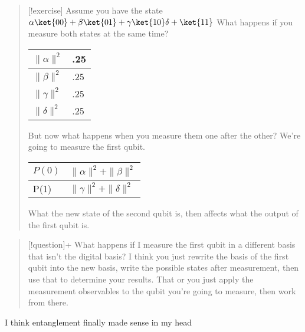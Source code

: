 \documentclass[]{article}
\begin{document}
\begin{quote}
{[}!exercise{]} Assume you have the state
\(\alpha \ket{00}+\beta \ket{01}+\gamma \ket{10}\delta+ \ket{11}\) What
happens if you measure both states at the same time?

\begin{longtable}[]{@{}ll@{}}
\toprule\noalign{}
\(\|\alpha\|^{2}\) & .25 \\
\midrule\noalign{}
\endhead
\bottomrule\noalign{}
\endlastfoot
\(\|\beta\|^{2}\) & .25 \\
\(\|\gamma\|^{2}\) & .25 \\
\(\|\delta\|^{2}\) & .25 \\
\end{longtable}

But now what happens when you measure them one after the other? We're
going to measure the first qubit.

\begin{longtable}[]{@{}ll@{}}
\toprule\noalign{}
\(P(0)\) & \(\|\alpha\|^{2}+\|\beta\|^{2}\) \\
\midrule\noalign{}
\endhead
\bottomrule\noalign{}
\endlastfoot
P(1) & \(\|\gamma\|^{2}+\|\delta\|^{2}\) \\
\end{longtable}

What the new state of the second qubit is, then affects what the output
of the first qubit is.
\end{quote}

\begin{quote}
{[}!question{]}+ What happens if I measure the first qubit in a
different basis that isn't the digital basis? I think you just rewrite
the basis of the first qubit into the new basis, write the possible
states after measurement, then use that to determine your results. That
or you just apply the measurement observables to the qubit you're going
to measure, then work from there.
\end{quote}

I think entanglement finally made sense in my head
\end{document}
